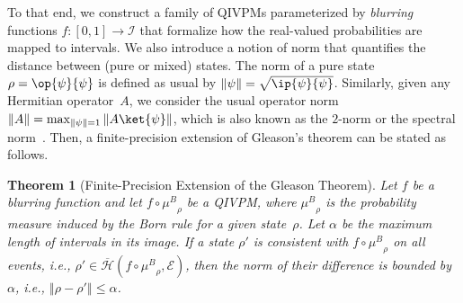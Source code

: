 \documentclass[english,reprint, aps, prl,superscriptaddress, showpacs,
showkeys, longbibliography, amsmath, amssymb, floatfix]{revtex4-1}
\theoremstyle{plain}
\newtheorem{thm}{Theorem}
\theoremstyle{definition}
\newcommand{\Hilb}{\mathcal{H}}
\newcommand{\events}{\ensuremath{\mathcal{E}}}
\newcommand{\proj}[1]{\op{#1}{#1}}
\newcommand{\coreBorn}{\ensuremath{\overline{\Hilb}}}
\newcommand{\ultramodular}{\mathcal{M}}
\newcommand{\muB}{\ensuremath{\mu^{B}}}
\begin{document}
To that end, we construct a family of QIVPMs parameterized by
\emph{blurring} functions $f:\left[0,1\right]\rightarrow\mathscr{I}$ that
formalize how the real-valued probabilities are mapped to
intervals. We also introduce a notion of norm that quantifies the
distance between (pure or mixed) states.  The norm of a pure
state $\rho=\proj{\psi}$ is defined as usual by
$\left\Vert \psi\right\Vert =\sqrt{\ip{\psi}{\psi}}$.  Similarly,
given any Hermitian operator~$A$, we consider the usual operator norm
$\left\Vert A\right\Vert =\max_{\left\Vert \psi\right\Vert
  =1}\left\Vert A\ket{\psi}\right\Vert $, which is also known as the
$2$-norm or the spectral
norm~\citep{RobertsVarberg1973,peres1995quantum,GolubVanLoan1996,Foucart2012}.
Then, a finite-precision extension of Gleason's theorem can be stated as
follows.



\begin{thm}[Finite-Precision Extension of the Gleason
  Theorem]\label{thm:Finite-precision-Gleason}Let $f$ be a blurring
  function and let $f \circ \muB_{\rho}$ be a QIVPM, where
  $\muB_{\rho}$ is the probability measure induced by the
  Born rule for a given state~$\rho$. Let $\alpha$ be the maximum
  length of intervals in its image. If a state $\rho'$ is consistent
  with $f\circ\muB_{\rho}$ on all events, i.e.,
  $\rho'\in\coreBorn\left(f\circ\muB_{\rho},\events\right)$,
  then the norm of their difference is bounded by $\alpha$, i.e.,
  $\left\Vert \rho-\rho'\right\Vert \le \alpha$.\end{thm}
\end{document}
